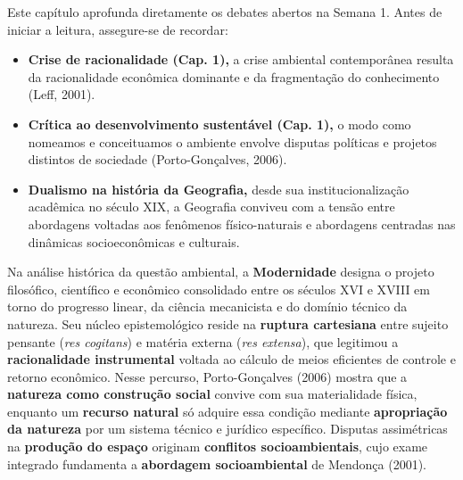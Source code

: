 \begin{capRevisao}
Este capítulo aprofunda diretamente os debates abertos na Semana 1. Antes de iniciar a leitura, assegure-se de recordar:
\begin{itemize}[leftmargin=1.5em, itemsep=2.5pt]
  \item \textbf{Crise de racionalidade (Cap. 1),} a crise ambiental contemporânea resulta da racionalidade econômica dominante e da fragmentação do conhecimento (Leff, 2001).
  \item \textbf{Crítica ao desenvolvimento sustentável (Cap. 1),} o modo como nomeamos e conceituamos o ambiente envolve disputas políticas e projetos distintos de sociedade (Porto-Gonçalves, 2006).
  \item \textbf{Dualismo na história da Geografia,} desde sua institucionalização acadêmica no século XIX, a Geografia conviveu com a tensão entre abordagens voltadas aos fenômenos físico-naturais e abordagens centradas nas dinâmicas socioeconômicas e culturais.
\end{itemize}
\end{capRevisao}


\begin{boxSimbolo}
Na análise histórica da questão ambiental, a \textbf{Modernidade} designa o projeto filosófico, científico e econômico consolidado entre os séculos XVI e XVIII em torno do progresso linear, da ciência mecanicista e do domínio técnico da natureza. Seu núcleo epistemológico reside na \textbf{ruptura cartesiana} entre sujeito pensante (\emph{res cogitans}) e matéria externa (\emph{res extensa}), que legitimou a \textbf{racionalidade instrumental} voltada ao cálculo de meios eficientes de controle e retorno econômico. Nesse percurso, Porto-Gonçalves (2006) mostra que a \textbf{natureza como construção social} convive com sua materialidade física, enquanto um \textbf{recurso natural} só adquire essa condição mediante \textbf{apropriação da natureza} por um sistema técnico e jurídico específico. Disputas assimétricas na \textbf{produção do espaço} originam \textbf{conflitos socioambientais}, cujo exame integrado fundamenta a \textbf{abordagem socioambiental} de Mendonça (2001).
\end{boxSimbolo}

